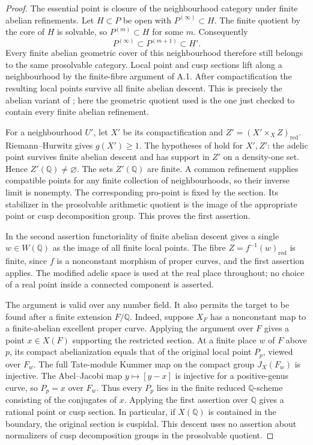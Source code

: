 \begin{proof}
The essential point is closure of the neighbourhood category under
finite abelian refinements. Let $H\subset P$ be open with
$P^{(\infty)}\subset H$. The finite quotient by the core of $H$ is
solvable, so $P^{(m)}\subset H$ for some $m$. Consequently
\[
 P^{(\infty)}\subset P^{(m+1)}\subset H'.
\]
Every finite abelian geometric cover of this neighbourhood therefore
still belongs to the same prosolvable category. Local point and cusp
sections lift along a neighbourhood by the finite-fibre argument of A.1.
After compactification the resulting local points survive all finite
abelian descent. This is precisely the abelian variant of
\citet[Theorem 2.1 and its subsequent variant for characteristic geometric
quotients]{AMHarariStix2012}; here the geometric quotient used is the one
just checked to contain every finite abelian refinement.

For a neighbourhood $U'$, let $X'$ be its compactification and
$Z'=(X'\times_X Z)_{\mathrm{red}}$. Riemann--Hurwitz gives $g(X')\geq1$.
The hypotheses of \citet[Theorem 8.2]{AMStoll2007} hold for $X',Z'$:
the adelic point survives finite abelian descent and has support in
$Z'$ on a density-one set. Hence $Z'(\mathbb Q)\ne\varnothing$.
The sets $Z'(\mathbb Q)$ are finite. A common refinement supplies
compatible points for any finite collection of neighbourhoods, so their
inverse limit is nonempty. The corresponding pro-point is fixed by the
section. Its stabilizer in the prosolvable arithmetic quotient is the
image of the appropriate point or cusp decomposition group. This proves
the first assertion.

In the second assertion functoriality of finite abelian descent gives a
single $w\in W(\mathbb Q)$ as the image of all finite local points.
The fibre $Z=f^{-1}(w)_{\mathrm{red}}$ is finite, since $f$ is a
nonconstant morphism of proper curves, and the first assertion applies.
The modified adelic space is used at the real place throughout; no
choice of a real point inside a connected component is asserted.

The argument is valid over any number field. It also permits the
target to be found after a finite extension $F/\mathbb Q$.
Indeed, suppose $X_F$ has a nonconstant map to a finite-abelian
excellent proper curve. Applying the argument over $F$ gives a
point $x\in X(F)$ supporting the restricted section. At a finite
place $w$ of $F$ above $p$, its compact abelianization equals that
of the original local point $P_p$, viewed over $F_w$.
The full Tate-module Kummer map on the compact group
$J_X(F_w)$ is injective. The Abel--Jacobi map
$y\mapsto[y-x]$ is injective for a positive-genus curve, so
$P_p=x$ over $F_w$. Thus every $P_p$ lies in the finite reduced
$\mathbb Q$-scheme consisting of the conjugates of $x$.
Applying the first assertion over $\mathbb Q$ gives a rational
point or cusp section. In particular, if $X(\mathbb Q)$ is
contained in the boundary, the original section is cuspidal.
This descent uses no assertion about normalizers of cusp
decomposition groups in the prosolvable quotient.
\end{proof}

